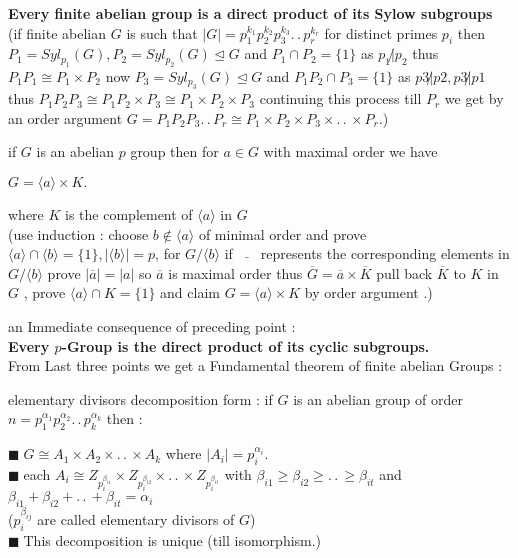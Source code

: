 \documentclass[11pt]{extarticle}
\newcommand{\ck}{.\,.\,}
\newcommand{\snote}[1]{{\footnotesize(#1)}}
\newcommand{\y}{$\blacksquare\;$}
\newcommand{\gen}[1]{\langle #1 \rangle}
\newcommand{\tbx}[2][]{
	\begin{tcolorbox}[enhanced,breakable,size=small,colback=black!2!white,title={#1},arc is angular, arc=1.5mm,drop fuzzy shadow]
		#2
	\end{tcolorbox}
}
\begin{document}
\begin{multicols}{2}
{		
	}
	\tbx{{\large \textbf{Every finite abelian group is a direct product of its Sylow subgroups} }\\
		\snote{if finite abelian $ G $ is such that $ |G|= p_1^{k_1}p_2^{k_2}p_3^{k_3}\ck p_r^{k_r} $ for distinct primes $ p_i $ then $ P_1=Syl_{p_1}(G), P_2=Syl_{p_2}(G) \trianglelefteq G$ and $ P_1 \cap P_2 =\{1\} $ as $ p_1 \not| p_2 $ thus $ P_1P_1\cong P_1 \times P_2 $ now $ P_3=Syl_{p_3}(G) \trianglelefteq G$ and $ P_1P_2 \cap P_3 =\{1\}$ as $ p3\not| p2,p3 \not|p1 $ thus $ P_1P_2P_3\cong P_1 P_2 \times P_3 \cong P_1\times P_2 \times P_3 $ continuing this process till $ P_r $ we get by an order argument $ G=P_1P_2P_3\ck P_r \cong P_1 \times P_2 \times P_3 \times \ck \times P_r .$}
	}
	\tbx{if  $G $ is an abelian $ p $ group then for $ a\in G $ with maximal order we have 
		\begin{center}
			$ G= \gen{a}\times K .$
		\end{center}where $ K $ is the complement of $ \gen{a} $ in $ G $ \\
		\snote{use induction : choose $ b\notin \gen{a} $ of minimal order and prove $ \gen{a}\cap \gen{b}=\{1\},|\gen{b}|=p $, for $ G/\gen{b} $ if  $\,\bar{\quad} \,$ represents the corresponding elements in $ G/\gen{b} $ prove $ |\overline{a}| =|a|$  so $ \overline{a} $ is maximal order thus $ \overline{G}=\overline{a}\times \overline{K} $ pull back $ \overline{K} $ to $ K $ in $ G $ , prove $ \gen{a}\cap K =\{1\} $ and claim $ G=\gen{a}\times K $ by order argument .}
	}
	\tbx{an Immediate consequence of preceding point :\\
		\textbf{ Every $ p $-Group is the direct product of its cyclic subgroups.}\\
		From Last three points we get a Fundamental theorem of finite abelian Groups :
	}
	\tbx[\textbf{ Fundamental theorem of finite abelian Groups} ]{elementary divisors decomposition form :  
		if $ G $ is an abelian group of order $ n=p_1^{\alpha_1}p_2^{\alpha_2}\ck p_k^{\alpha_k} $ then :
		
		\y  $ G \cong A_1 \times A_2 \times \ck \times A_k $ where $ |A_i|=p_i^{\alpha_i} .$ \\
		\y  each $ A_i \cong Z_{p_i^{\beta_{i1}}} \times Z_{p_i^{\beta_{i2}}}\times \ck \times Z_{p_i^{\beta_{it}}}$  with  
		$ \beta_{i1}\geq \beta_{i2} \geq \ck \geq \beta_{it} $ and $ \beta_{i1}+\beta_{i2}+\ck +\beta_{it} = \alpha_i $\\
		\snote{$ p_i^{\beta_{ij}} $ are called elementary divisors of $ G $}\\
		\y  This decomposition is unique (till isomorphism.) 
		
}
\end{multicols}
\end{document}
